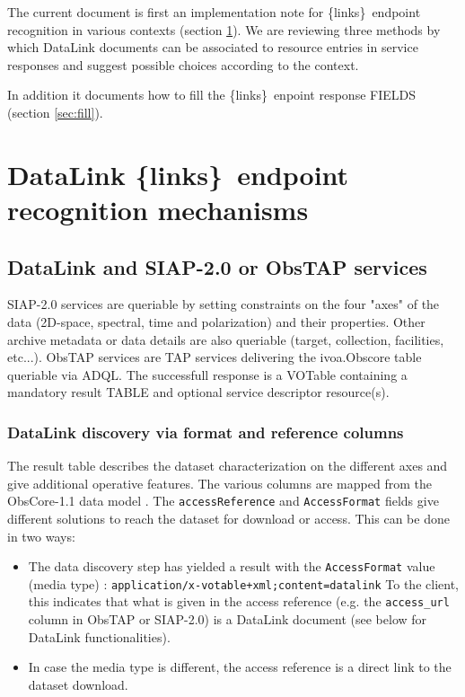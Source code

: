 \documentclass[11pt,a4paper]{ivoa}
\newcommand{\blinks}{\{links\}}
\begin{document}
The  current document  is first an implementation note for \blinks\ endpoint recognition 
in various contexts (section \ref{sec:reco}). We are reviewing three methods by which
DataLink documents can be associated to  resource entries in service responses and suggest
possible choices according to the context. 

In addition it documents how to fill the \blinks\ enpoint response FIELDS (section 
\ref{sec:fill}).

\section{DataLink \blinks\ endpoint recognition mechanisms}
\label{sec:reco}
\subsection{DataLink and SIAP-2.0 or ObsTAP services}

SIAP-2.0 \citep{2015ivoa.spec.1223D} services  are queriable by setting constraints on 
the four "axes" of the data (2D-space, spectral, time and polarization) and their properties.
Other archive metadata or data details are also queriable  (target, collection, facilities,
etc...). ObsTAP services are TAP services delivering the ivoa.Obscore table queriable 
via ADQL. The successfull response is a VOTable containing a mandatory  result TABLE and
optional service descriptor resource(s).

\subsubsection{DataLink discovery via format and reference columns}
The result table describes the dataset characterization on the different axes and give 
additional operative features. The various columns are mapped from the ObsCore-1.1 
data model \citep{2017ivoa.spec.0509L}. The \verb|accessReference| and \verb|AccessFormat|
fields give different solutions to reach the dataset for download or access.  This can be 
done in two ways: 
\begin{itemize}
\item The data discovery step has yielded a result with the \verb|AccessFormat| value 
(media type) :
\verb|application/x-votable+xml;content=datalink|
 To the client, this indicates that what is given in the access reference (e.g. the 
\verb|access_url| column in ObsTAP or SIAP-2.0)  is a DataLink document (see below for
DataLink functionalities). 
\item In case the media type is different, the access reference is a direct link to the 
dataset download. 
\end{itemize}
\end{document}
